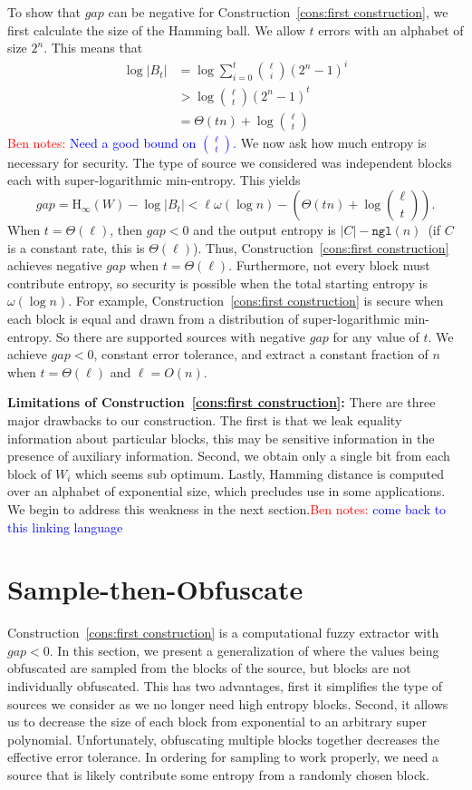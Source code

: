 \documentclass[11pt]{article}
\newcommand{\consref}[1]{\mbox{Construction~\ref{#1}}}
\newcommand{\ngl}{\ensuremath{\mathtt{ngl}}\xspace}
\newcommand{\Hoo}{\mathrm{H}_\infty}
\newcommand{\authnote}[2]{{\textcolor{red}{\textsf{#1 notes: }\textcolor{blue}{ #2}}\marginpar{\textcolor{red}{\textbf{!!!!!}}}}}
\newcommand{\authnote}[2]{}
\newcommand{\bnote}[1]{{\authnote{Ben}{#1}}}
\begin{document}
To show that $gap$ can be negative for \consref{cons:first construction}, we first calculate the size of the Hamming ball.  We allow $t$ errors with an alphabet of size $2^n$.  This means that
\begin{align*}
\log |B_t| &= \log \sum_{i=0}^t {\ell \choose i} (2^n-1)^i\\
&> \log {\ell \choose t} (2^n-1)^t\\
&=\Theta(tn) + \log {\ell\choose t}
\end{align*}
\bnote{Need a good bound on ${\ell \choose t}$.}
We now ask how much entropy is necessary for security.  The type of source we considered was independent blocks each with super-logarithmic min-entropy.  This yields 
\[
gap = \Hoo(W) - \log |B_t| < \ell \omega(\log n) -\left( \Theta(t n) + \log {\ell \choose t}\right). 
\]
When $t =\Theta(\ell)$, then $gap<0$ and the output entropy is $|C| - \ngl(n)$~(if $C$ is a constant rate, this is $\Theta(\ell)$).
Thus, \consref{cons:first construction} achieves negative $gap$ when $t = \Theta(\ell)$.  Furthermore, not every block must contribute entropy, so security is possible when the total starting entropy is $\omega(\log n)$.  For example, \consref{cons:first construction} is secure when each block is equal and drawn from a distribution of super-logarithmic min-entropy.  So there are supported sources with negative $gap$ for any value of $t$.  We achieve $gap<0$, constant error tolerance, and extract a constant fraction of $n$ when $t = \Theta(\ell)$ and $\ell = O(n)$.

\textbf{Limitations of \consref{cons:first construction}:}  There are three major drawbacks to our construction.   The first is that we leak equality information about particular blocks, this may be sensitive information in the presence of auxiliary information.  Second, we obtain only a single bit from each block of $W_i$ which seems sub optimum.  Lastly, Hamming distance is computed over an alphabet of exponential size, which precludes use in some applications. We begin to address this weakness in the next section.\bnote{come back to this linking language}

\section{Sample-then-Obfuscate}
\consref{cons:first construction} is a computational fuzzy extractor with $gap<0$.  In this section, we present a generalization of where the values being obfuscated are sampled from the blocks of the source, but blocks are not individually obfuscated.  This has two advantages, first it simplifies the type of sources we consider as we no longer need high entropy blocks.  Second, it allows us to decrease the size of each block from exponential to an arbitrary super polynomial.  Unfortunately, obfuscating multiple blocks together decreases the effective error tolerance.  In ordering for sampling to work properly, we need a source that is likely contribute some entropy from a randomly chosen block.  
\end{document}
